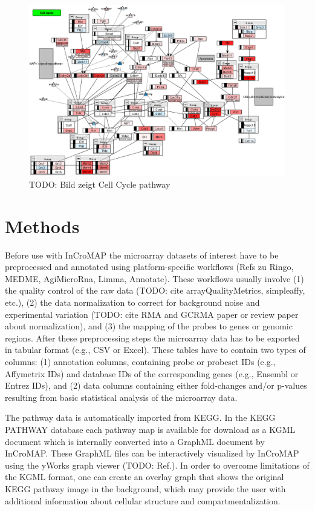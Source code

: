 \documentclass{bioinfo}
\begin{document}
\begin{figure}[tb]
\centering
\includegraphics[width=.5\textwidth]{figures/mmu04110.png}
\caption{
TODO: Bild zeigt Cell Cycle pathway}\label{fig:cellcycle}
\end{figure}

\section{Methods}

Before use with InCroMAP the microarray datasets of interest have to be preprocessed and annotated
using platform-specific workflows (Refs zu Ringo, MEDME, AgiMicroRna, Limma, Annotate). These
workflows usually involve (1) the quality control of the raw data (TODO: cite arrayQualityMetrics,
simpleaffy, etc.), (2) the data normalization to correct for background noise and experimental
variation (TODO: cite RMA and GCRMA paper or review paper about normalization), and (3) the mapping
of the probes to genes or genomic regions. After these preprocessing steps the microarray data has
to be exported in tabular format (e.g., CSV or Excel). These tables have to contain two types of
columns: (1) annotation columns, containing probe or probeset IDs (e.g., Affymetrix IDs) and
database IDs of the corresponding genes (e.g., Ensembl or Entrez IDs), and (2) data columns
containing either fold-changes and/or p-values resulting from basic statistical analysis of the 
microarray data.


The pathway data is automatically imported from KEGG. In the KEGG PATHWAY database each pathway map
is available for download as a KGML document which is internally converted into a GraphML document
by InCroMAP. These GraphML files can be interactively visualized by InCroMAP using the yWorks graph
viewer (TODO: Ref.). In order to overcome limitations of the KGML format, one can create an overlay
graph that shows the original KEGG pathway image in the background, which may provide the user with
additional information about cellular structure and compartmentalization.
\end{document}
